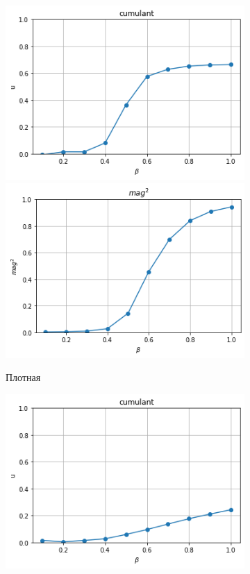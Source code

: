 \begin{figure}[ht]
	\centering
	\begin{subfigure}[t]{0.48\textwidth}
		\includegraphics[width=\textwidth]{../images/dense_cumulant.png} 
		\includegraphics[width=\textwidth]{../images/dense_magnetization.png} 
		\caption{Плотная}
	\end{subfigure}
	\begin{subfigure}[t]{0.48\textwidth}
		\includegraphics[width=\textwidth]{../images/loose_cumulant.png} 

\end{subfigure}
\end{figure}
